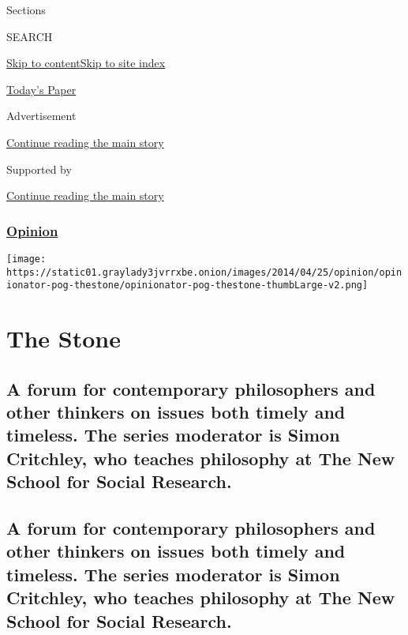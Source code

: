 Sections

SEARCH

\protect\hyperlink{site-content}{Skip to
content}\protect\hyperlink{site-index}{Skip to site index}

\href{https://myaccount.nytimes3xbfgragh.onion/auth/login?response_type=cookie\&client_id=vi}{}

\href{https://www.nytimes3xbfgragh.onion/section/todayspaper}{Today's
Paper}

Advertisement

\protect\hyperlink{after-top}{Continue reading the main story}

Supported by

\protect\hyperlink{after-sponsor}{Continue reading the main story}

\hypertarget{opinion}{%
\subsubsection{\texorpdfstring{\href{/section/opinion}{Opinion}}{Opinion}}\label{opinion}}

\texttt{[image: https://static01.graylady3jvrrxbe.onion/images/2014/04/25/opinion/opinionator-pog-thestone/opinionator-pog-thestone-thumbLarge-v2.png]}

\hypertarget{the-stone}{%
\section{The Stone}\label{the-stone}}

\hypertarget{a-forum-for-contemporary-philosophers-and-other-thinkers-on-issues-both-timely-and-timeless-the-series-moderator-is-simon-critchley-who-teaches-philosophy-at-the-new-school-for-social-research}{%
\subsection{A forum for contemporary philosophers and other thinkers on
issues both timely and timeless. The series moderator is Simon
Critchley, who teaches philosophy at The New School for Social
Research.}\label{a-forum-for-contemporary-philosophers-and-other-thinkers-on-issues-both-timely-and-timeless-the-series-moderator-is-simon-critchley-who-teaches-philosophy-at-the-new-school-for-social-research}}

\hypertarget{a-forum-for-contemporary-philosophers-and-other-thinkers-on-issues-both-timely-and-timeless-the-series-moderator-is-simon-critchley-who-teaches-philosophy-at-the-new-school-for-social-research-1}{%
\subsection{A forum for contemporary philosophers and other thinkers on
issues both timely and timeless. The series moderator is Simon
Critchley, who teaches philosophy at The New School for Social
Research.}\label{a-forum-for-contemporary-philosophers-and-other-thinkers-on-issues-both-timely-and-timeless-the-series-moderator-is-simon-critchley-who-teaches-philosophy-at-the-new-school-for-social-research-1}}

